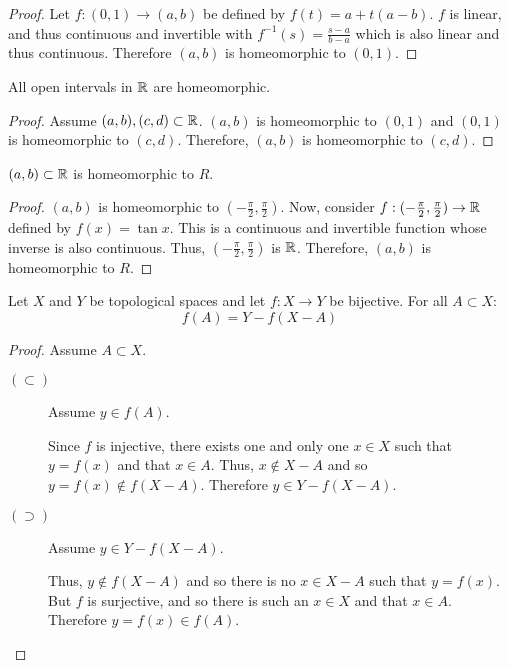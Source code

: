 \documentclass[letterpaper,12pt,fleqn]{article}
\begin{document}
\begin{proof}
  Let \(f:(0,1)\to(a,b)\) be defined by \(f(t)=a+t(a-b)\).  \(f\) is linear, and thus continuous and invertible
  with \(f^{-1}(s)=\frac{s-a}{b-a}\) which is also linear and thus continuous.  Therefore \((a,b)\) is homeomorphic
  to \((0,1)\).
\end{proof}

\begin{corollary}
  All open intervals in \(\mathbb{R}\) are homeomorphic.
\end{corollary}

\begin{proof}
  Assume \((a,b),(c,d)\subset\mathbb{R}\).  \((a,b)\) is homeomorphic to \((0,1)\) and \((0,1)\) is homeomorphic to
  \((c,d)\).  Therefore, \((a,b)\) is homeomorphic to \((c,d)\).
\end{proof}

\begin{theorem}[7.27]
  \((a,b)\subset\mathbb{R}\) is homeomorphic to \(R\).
\end{theorem}

\begin{proof}
  \((a,b)\) is homeomorphic to \((-\frac{\pi}{2},\frac{\pi}{2})\).  Now, consider
  \(f:(-\frac{\pi}{2},\frac{\pi}{2})\to\mathbb{R}\) defined by \(f(x)=\tan x\).  This is a continuous and invertible
  function whose inverse is also continuous.  Thus, \((-\frac{\pi}{2},\frac{\pi}{2})\) is \(\mathbb{R}\).  Therefore,
  \((a,b)\) is homeomorphic to \(R\).
\end{proof}

\begin{lemma}
  Let \(X\) and \(Y\) be topological spaces and let \(f:X\to Y\) be bijective.  For all \(A\subset X\):
  \[f(A)=Y-f(X-A)\]
\end{lemma}

\begin{proof}
  Assume \(A\subset X\).
  \begin{description}
  \item[\((\subset)\)] Assume \(y\in f(A)\).

    Since \(f\) is injective, there exists one and only one \(x\in X\) such that \(y=f(x)\) and that \(x\in A\).
    Thus, \(x\notin X-A\) and so \(y=f(x)\notin f(X-A)\).  Therefore \(y\in Y-f(X-A)\).

  \item[\((\supset)\)] Assume \(y\in Y-f(X-A)\).

    Thus, \(y\notin f(X-A)\) and so there is no \(x\in X-A\) such that \(y=f(x)\).  But \(f\) is surjective, and
    so there is such an \(x\in X\) and that \(x\in A\).  Therefore \(y=f(x)\in f(A)\).
  \end{description}
\end{proof}
\end{document}
